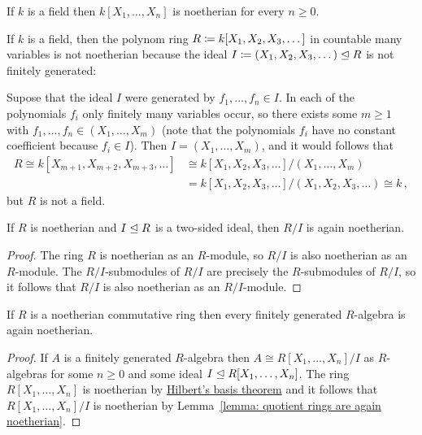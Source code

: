 \begin{example}
  If $k$ is a field then $k[X_1, \dotsc, X_n]$ is noetherian for every $n \geq 0$.
\end{example}


\begin{example}
  If $k$ is a field, then the polynom ring $R \coloneqq k[X_1, X_2, X_3, \dotsc]$ in countable many variables is not noetherian because the ideal $I \coloneqq (X_1, X_2, X_3, \dotsc) \trianglelefteq R$ is not finitely generated:
  
  Supose that the ideal $I$ were generated by $f_1, \dotsc, f_n \in I$.
  In each of the polynomials $f_i$ only finitely many variables occur, so there exists some $m \geq 1$ with $f_1, \dotsc, f_n \in (X_1, \dotsc, X_m)$ (note that the polynomials $f_i$ have no constant coefficient because $f_i \in I$).
  Then $I = (X_1, \dotsc, X_m)$, and it would follows that
  \begin{align*}
            R
     \cong  k[X_{m+1}, X_{m+2}, X_{m+3}, \dotsc]
    &\cong  k[X_1, X_2, X_3, \dotsc]/(X_1, \dotsc, X_m)  \\
    &=      k[X_1, X_2, X_3, \dotsc]/(X_1, X_2, X_3, \dotsc)
     \cong  k \,,
  \end{align*}
  but $R$ is not a field.
\end{example}


\begin{lemma}
  \label{lemma: quotient rings are again noetherian}
  If $R$ is noetherian and $I \trianglelefteq R$ is a two-sided ideal, then $R/I$ is again noetherian.
\end{lemma}


\begin{proof}
  The ring $R$ is noetherian as an $R$-module, so $R/I$ is also noetherian as an $R$-module.
  The $R/I$-submodules of $R/I$ are precisely the $R$-submodules of $R/I$, so it follows that $R/I$ is also noetherian as an $R/I$-module.
\end{proof}


\begin{corollary}
  \label{corollary: finite type preserves noetherian}
  If $R$ is a noetherian commutative ring then every finitely generated $R$-algebra is again noetherian.
\end{corollary}


\begin{proof}
  If $A$ is a finitely generated $R$-algebra then $A \cong R[X_1, \dotsc, X_n]/I$ as $R$-algebras for some $n \geq 0$ and some ideal $I \trianglelefteq R[X_1, \dotsc, X_n]$.
  The ring $R[X_1, \dotsc, X_n]$ is noetherian by \hyperref[theorem: Hilberts basis theorem]{Hilbert's basis theorem} and it follows that $R[X_1, \dotsc, X_n]/I$ is noetherian by Lemma~\ref{lemma: quotient rings are again noetherian}.
\end{proof}





